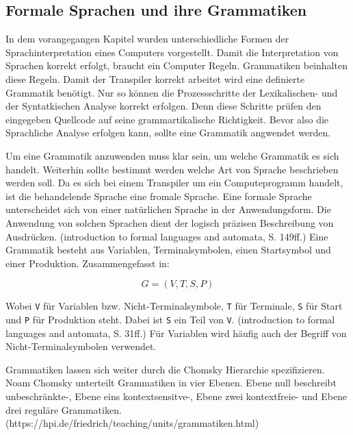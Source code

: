 \pagebreak
   
   
\subsection{Formale Sprachen und ihre Grammatiken}
In dem vorangegangen Kapitel wurden unterschiedliche Formen der Sprachinterpretation eines Computers vorgestellt. Damit die Interpretation von Sprachen korrekt erfolgt, braucht ein Computer Regeln. Grammatiken beinhalten diese Regeln. Damit der Transpiler korrekt arbeitet wird eine definierte Grammatik benötigt. Nur so können die Prozessschritte der Lexikalischen- und der Syntatkischen Analyse korrekt erfolgen. Denn diese Schritte prüfen den eingegeben Quellcode auf seine grammartikalische Richtigkeit. Bevor also die Sprachliche Analyse erfolgen kann, sollte eine Grammatik angwendet werden.
	
Um eine Grammatik anzuwenden muss klar sein, um welche Grammatik es sich handelt. Weiterhin sollte bestimmt werden welche Art von Sprache beschrieben werden soll. 
Da es sich bei einem Transpiler um ein Computeprogramm handelt, ist die behandelende Sprache eine fromale Sprache. Eine formale Sprache unterscheidet sich von einer natürlichen Sprache in der Anwendungsform. Die Anwendung von solchen Sprachen dient der logisch präzisen Beschreibung von Ausdrücken. (introduction to formal languages and automata, S. 149ff.) Eine Grammatik besteht aus Variablen, Terminalsymbolen, einen Startsymbol und einer Produktion. Zusammengefasst in:

\begin{center}
\begin{equation}
G=(V,T,S,P)
\end{equation}
\end{center}

Wobei \verb+V+ für Variablen bzw. Nicht-Terminalsymbole, \verb+T+ für Terminale, \verb+S+ für Start und \verb+P+ für Produktion steht. Dabei ist \verb+S+ ein Teil von \verb+V+. (introduction to formal languages and automata, S. 31ff.) Für Variablen wird häufig auch der Begriff von Nicht-Terminalsymbolen verwendet.

Grammatiken lassen sich weiter durch die Chomsky Hierarchie spezifizieren. Noam Chomsky unterteilt Grammatiken in vier Ebenen. Ebene null beschreibt unbeschränkte-, Ebene eins kontextsensitve-, Ebene zwei kontextfreie- und Ebene drei reguläre Grammatiken.(https://hpi.de/friedrich/teaching/units/grammatiken.html) 

